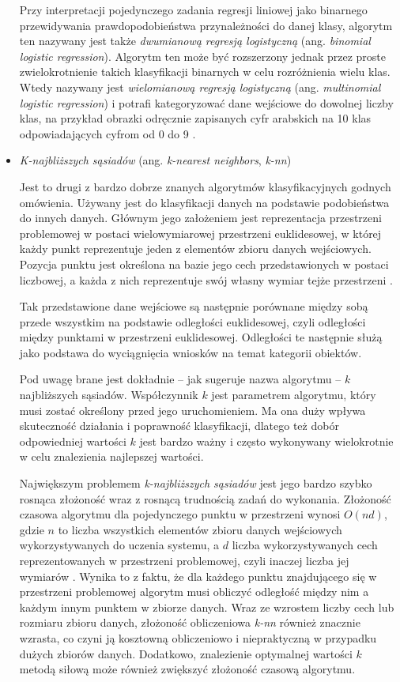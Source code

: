 \begin{itemize}
        Przy interpretacji pojedynczego zadania regresji liniowej jako binarnego przewidywania prawdopodobieństwa przynależności do danej klasy, algorytm ten nazywany jest także \emph{dwumianową regresją logistyczną} (ang. \emph{binomial logistic regression}).
        Algorytm ten może być rozszerzony jednak przez proste zwielokrotnienie takich klasyfikacji binarnych w celu rozróżnienia wielu klas.
        Wtedy nazywany jest \emph{wielomianową regresją logistyczną} (ang. \emph{multinomial logistic regression}) i potrafi kategoryzować dane wejściowe do dowolnej liczby klas, na przykład obrazki odręcznie zapisanych cyfr arabskich na 10 klas odpowiadających cyfrom od 0 do 9 \cite{palvanov2018comparisons}.

  \item \emph{K-najbliższych sąsiadów} (ang. \emph{k-nearest neighbors}, \emph{k-nn})

        Jest to drugi z bardzo dobrze znanych algorytmów klasyfikacyjnych godnych omówienia.
        Używany jest do klasyfikacji danych na podstawie podobieństwa do innych danych.
        Głównym jego założeniem jest reprezentacja przestrzeni problemowej w postaci wielowymiarowej przestrzeni euklidesowej, w której każdy punkt reprezentuje jeden z elementów zbioru danych wejściowych.
        Pozycja punktu jest określona na bazie jego cech przedstawionych w postaci liczbowej, a każda z nich reprezentuje swój własny wymiar tejże przestrzeni \cite{kramer2013k}.

        Tak przedstawione dane wejściowe są następnie porównane między sobą przede wszystkim na podstawie odległości euklidesowej, czyli odległości między punktami w przestrzeni euklidesowej.
        Odległości te następnie służą jako podstawa do wyciągnięcia wniosków na temat kategorii obiektów.

        Pod uwagę brane jest dokładnie -- jak sugeruje nazwa algorytmu -- $k$ najbliższych sąsiadów.
        Współczynnik $k$ jest parametrem algorytmu, który musi zostać określony przed jego uruchomieniem.
        Ma ona duży wpływa skuteczność działania i poprawność klasyfikacji, dlatego też dobór odpowiedniej wartości $k$ jest bardzo ważny i często wykonywany wielokrotnie w celu znalezienia najlepszej wartości.

        Największym problemem \emph{k-najbliższych sąsiadów} jest jego bardzo szybko rosnąca złożoność wraz z rosnącą trudnością zadań do wykonania.
        Złożoność czasowa algorytmu dla pojedynczego punktu w przestrzeni wynosi $O(nd)$, gdzie $n$ to liczba wszystkich elementów zbioru danych wejściowych wykorzystywanych do uczenia systemu, a $d$ liczba wykorzystywanych cech reprezentowanych w przestrzeni problemowej, czyli inaczej liczba jej wymiarów \cite{laviale2023deep}.
        Wynika to z faktu, że dla każdego punktu znajdującego się w przestrzeni problemowej algorytm musi obliczyć odległość między nim a każdym innym punktem w zbiorze danych.
        Wraz ze wzrostem liczby cech lub rozmiaru zbioru danych, złożoność obliczeniowa \emph{k-nn} również znacznie wzrasta, co czyni ją kosztowną obliczeniowo i niepraktyczną w przypadku dużych zbiorów danych.
        Dodatkowo, znalezienie optymalnej wartości $k$ metodą siłową może również zwiększyć złożoność czasową algorytmu.


\end{itemize}
